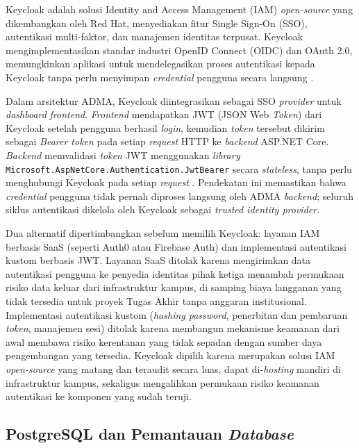 Keycloak adalah solusi Identity and Access Management (IAM) \textit{open-source} yang dikembangkan oleh Red Hat, menyediakan fitur Single Sign-On (SSO), autentikasi multi-faktor, dan manajemen identitas terpusat. Keycloak mengimplementasikan standar industri OpenID Connect (OIDC) dan OAuth 2.0, memungkinkan aplikasi untuk mendelegasikan proses autentikasi kepada Keycloak tanpa perlu menyimpan \textit{credential} pengguna secara langsung \cite{chatterjee2022keycloak}.

Dalam arsitektur ADMA, Keycloak diintegrasikan sebagai SSO \textit{provider} untuk \textit{dashboard} \textit{frontend}. \textit{Frontend} mendapatkan JWT (JSON Web \textit{Token}) dari Keycloak setelah pengguna berhasil \textit{login}, kemudian \textit{token} tersebut dikirim sebagai \textit{Bearer token} pada setiap \textit{request} HTTP ke \textit{backend} ASP.NET Core. \textit{Backend} memvalidasi \textit{token} JWT menggunakan \textit{library} \texttt{Microsoft.AspNetCore.Authentication.JwtBearer} secara \textit{stateless}, tanpa perlu menghubungi Keycloak pada setiap \textit{request} \cite{chatterjee2022keycloak}. Pendekatan ini memastikan bahwa \textit{credential} pengguna tidak pernah diproses langsung oleh ADMA \textit{backend}; seluruh siklus autentikasi dikelola oleh Keycloak sebagai \textit{trusted identity provider}.

Dua alternatif dipertimbangkan sebelum memilih Keycloak: layanan IAM berbasis SaaS (seperti Auth0 atau Firebase Auth) dan implementasi autentikasi kustom berbasis JWT. Layanan SaaS ditolak karena mengirimkan data autentikasi pengguna ke penyedia identitas pihak ketiga menambah permukaan risiko data keluar dari infrastruktur kampus, di samping biaya langganan yang tidak tersedia untuk proyek Tugas Akhir tanpa anggaran institusional. Implementasi autentikasi kustom (\textit{hashing password}, penerbitan dan pembaruan \textit{token}, manajemen sesi) ditolak karena membangun mekanisme keamanan dari awal membawa risiko kerentanan yang tidak sepadan dengan sumber daya pengembangan yang tersedia. Keycloak dipilih karena merupakan solusi IAM \textit{open-source} yang matang dan teraudit secara luas, dapat di-\textit{hosting} mandiri di infrastruktur kampus, sekaligus mengalihkan permukaan risiko keamanan autentikasi ke komponen yang sudah teruji.

\subsection{PostgreSQL dan Pemantauan \textit{Database}}

